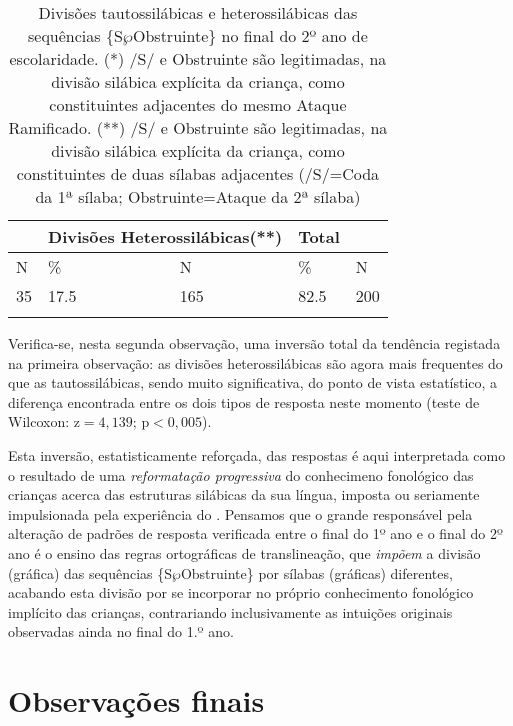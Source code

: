 \documentclass[output=paper]{LSP/langsci}
\begin{document}
\begin{table}[h]
\begin{tabular}{lllll}
\lsptoprule
\multicolumn{2}{l}{Divisões Tautosilábicas(*)} & \multicolumn{2}{l}{Divisões Heterossilábicas(**)} & Total \\
\midrule
N                    & \%                   & N                    & \%                     & N     \\
35                  & 17.5                 & 165                   & 82.5                   & 200  \\
\lspbottomrule
\end{tabular}
\caption{Divisões tautossilábicas e heterossilábicas das sequências \{S$\wp$Obstruinte\} no final do 2º ano de escolaridade. (*) /S/ e Obstruinte são legitimadas, na divisão silábica explícita da criança, como constituintes adjacentes do mesmo Ataque Ramificado. (**) /S/ e Obstruinte são legitimadas, na divisão silábica explícita da criança, como constituintes de duas sílabas adjacentes (/S/=Coda da 1ª sílaba; Obstruinte=Ataque da 2ª sílaba)}
\label{tab:miranda_3}
\end{table}

\newpage Verifica-se, nesta segunda observação, uma inversão total da tendência registada na primeira observação: as divisões heterossilábicas são agora mais frequentes do que as tautossilábicas, sendo muito significativa, do ponto de vista estatístico, a diferença encontrada entre os dois tipos de resposta neste momento (teste de Wilcoxon: z$=4,139$; p$<0,005$).

Esta inversão, estatisticamente reforçada, das respostas é aqui interpretada como o resultado de uma \textit{reformatação progressiva} do conhecimeno fonológico das crianças acerca das estruturas silábicas da sua língua, imposta ou seriamente impulsionada pela experiência do . Pensamos que o grande responsável pela alteração de padrões de resposta verificada entre o final do 1º ano e o final do 2º ano é o ensino das regras ortográficas de translineação, que \textit{impõem} a divisão (gráfica) das sequências \{S$\wp$Obstruinte\} por sílabas (gráficas) diferentes, acabando esta divisão por se incorporar no próprio conhecimento fonológico implícito das crianças, contrariando inclusivamente as intuições originais observadas ainda no final do 1.º ano.

\section{Observações finais}
\label{sec:miranda_conclusao}
\end{document}
